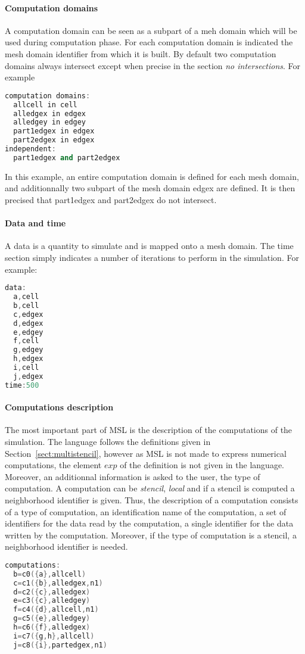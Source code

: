 \paragraph{Computation domains} A computation domain can be seen as a subpart of a meh domain which will be used during computation phase. For each computation domain is indicated the mesh domain identifier from which it is built. By default two computation domains always intersect except when precise in the section \emph{no intersections}. For example
\begin{lstlisting}[basicstyle=\small,mathescape,frame=single,language=C++]
computation domains:
  allcell in cell
  alledgex in edgex
  alledgey in edgey
  part1edgex in edgex
  part2edgex in edgex
independent:
  part1edgex and part2edgex
\end{lstlisting}
In this example, an entire computation domain is defined for each mesh domain, and additionnally two subpart of the mesh domain edgex are defined. It is then precised that part1edgex and part2edgex do not intersect.

\paragraph{Data and time} A data is a quantity to simulate and is mapped onto a mesh domain. The time section simply indicates a number of iterations to perform in the simulation. For example:
\begin{lstlisting}[basicstyle=\small,mathescape,frame=single,language=C++]
data:
  a,cell
  b,cell
  c,edgex
  d,edgex
  e,edgey
  f,cell
  g,edgey
  h,edgex
  i,cell
  j,edgex
time:500
\end{lstlisting}

\paragraph{Computations description} The most important part of MSL is the description of the computations of the simulation. The language follows the definitions given in Section~\ref{sect:multistencil}, however as MSL is not made to express numerical computations, the element $exp$ of the definition is not given in the language. Moreover, an additionnal information is asked to the user, the type of computation. A computation can be \emph{stencil}, \emph{local} and if a stencil is computed a neighborhood identifier is given.
Thus, the description of a computation consists of a type of computation, an identification name of the computation, a set of identifiers for the data read by the computation, a single identifier for the data written by the computation. Moreover, if the type of computation is a stencil, a neighborhood identifier is needed.
\begin{lstlisting}[basicstyle=\small,mathescape,frame=single,language=C++]
computations:
  b=c0({a},allcell)
  c=c1({b},alledgex,n1)
  d=c2({c},alledgex)
  e=c3({c},alledgey)
  f=c4({d},allcell,n1)
  g=c5({e},alledgey)
  h=c6({f},alledgex)
  i=c7({g,h},allcell)
  j=c8({i},partedgex,n1)
\end{lstlisting}

